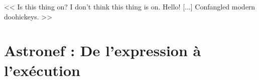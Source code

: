 \begin{savequote}[6cm]
<< Is this thing on? I don't think this thing is on. Hello! [...] Confangled modern doohickeys. >>
\end{savequote}

\chapter{Astronef : De l'expression à l'exécution}
\chaptertoc

\lstset{language=PrologAstral}






